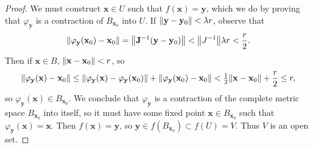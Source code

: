 \documentclass[11pt]{article}
\renewcommand{\vec}[1]{\mathbf{#1}}
\newcommand{\mat}[1]{\mathbf{#1}}
\begin{document}
\begin{adjustwidth}{0.5cm}{}
\begin{proof}
		We must construct $\vec{x} \in U$ such that $f(\vec{x}) = \vec{y}$, which we do by proving that $\varphi_{\vec{y}}$ is a contraction of $B_{\vec{x}_{0}}$ into $U$. If $\norm{\vec{y} - \vec{y}_{0}} < \lambda r$, observe that
		\[
			\norm{\varphi_{\vec{y}}(\vec{x}_{0}) - \vec{x}_{0}} = \norm{\mat{J}^{-1}(\vec{y} - \vec{y}_{0})} < \norm{J^{-1}} \lambda r < \frac{r}{2}.
		\]
		Then if $\vec{x} \in B$, $\norm{\vec{x} - \vec{x}_{0}} < r$, so
		\[
			\norm{\varphi_{\vec{y}}(\vec{x}) - \vec{x}_{0}} \le \norm{\varphi_{\vec{y}}(\vec{x}) - \varphi_{\vec{y}}(\vec{x}_{0})} + \norm{\varphi_{\vec{y}}(\vec{x}_{0}) - \vec{x}_{0}} < \tfrac{1}{2} \norm{\vec{x} - \vec{x}_{0}} + \frac{r}{2} \le r,
		\]
		so $\varphi_{\vec{y}}(\vec{x}) \in B_{\vec{x}_{0}}$. We conclude that $\varphi_{\vec{y}}$ is a contraction of the complete metric space $B_{\vec{x}_{0}}$ into itself, so it must have some fixed point $\vec{x} \in B_{\vec{x}_{0}}$ such that $\varphi_{\vec{y}}(\vec{x}) = \vec{x}$. Then $f(\vec{x}) = \vec{y}$, so $\vec{y} \in f(B_{\vec{x}_{0}}) \subset f(U) = V$. Thus $V$ is an open set.


\end{proof}
\end{adjustwidth}
\end{document}
